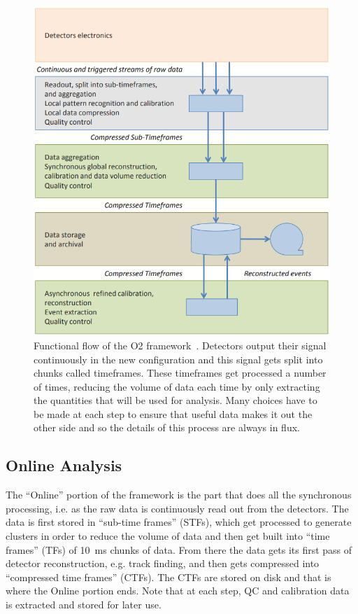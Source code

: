 \begin{figure}[h]
    \begin{center}
        \includegraphics[width=.6\textwidth]{Figs/O2_flow.png}
        \caption[Functional flow of the O2 framework]{Functional flow of the O2 framework~\cite{O2_Upgrade_TDR}. Detectors output their signal continuously in the new configuration and this signal gets split into chunks called timeframes. These timeframes get processed a number of times, reducing the volume of data each time by only extracting the quantities that will be used for analysis. Many choices have to be made at each step to ensure that useful data makes it out the other side and so the details of this process are always in flux.}
        \label{fig:O2_flow}
    \end{center}
\end{figure}

\subsection{Online Analysis}
The ``Online'' portion of the framework is the part that does all the synchronous processing, i.e. as the raw data is continuously read out from the detectors. The data is first stored in ``sub-time frames'' (STFs), which get processed to generate clusters in order to reduce the volume of data and then get built into ``time frames'' (TFs) of \SI{10}{\milli\second} chunks of data. From there the data gets its first pass of detector reconstruction, e.g. track finding, and then gets compressed into ``compressed time frames'' (CTFs). The CTFs are stored on disk and that is where the Online portion ends. Note that at each step, QC and calibration data is extracted and stored for later use.

